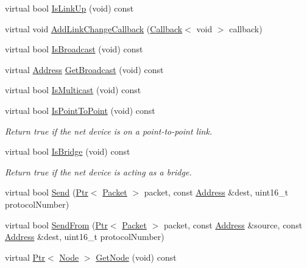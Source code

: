 \begin{DoxyCompactItemize}
\item 
virtual bool \hyperlink{classns3_1_1NonCommunicatingNetDevice_a63a1c604f491267806790c68832027b2}{Is\+Link\+Up} (void) const 
\item 
virtual void \hyperlink{classns3_1_1NonCommunicatingNetDevice_a3e37e30c8ea1ed6b7b78843d8f0155ba}{Add\+Link\+Change\+Callback} (\hyperlink{classns3_1_1Callback}{Callback}$<$ void $>$ callback)
\item 
virtual bool \hyperlink{classns3_1_1NonCommunicatingNetDevice_aa23dbd12d8ecc43f56a2367e9b39697f}{Is\+Broadcast} (void) const 
\item 
virtual \hyperlink{classns3_1_1Address}{Address} \hyperlink{classns3_1_1NonCommunicatingNetDevice_a7567737cf4a1a57835e406eaf68a1a34}{Get\+Broadcast} (void) const 
\item 
virtual bool \hyperlink{classns3_1_1NonCommunicatingNetDevice_a2b59ab714a2c4140fb0c9d6bb3eb1c25}{Is\+Multicast} (void) const 
\item 
virtual bool \hyperlink{classns3_1_1NonCommunicatingNetDevice_a9cdfd17a8bec4aae3527c55bf5b7a289}{Is\+Point\+To\+Point} (void) const 
\begin{DoxyCompactList}\small\item\em Return true if the net device is on a point-\/to-\/point link. \end{DoxyCompactList}\item 
virtual bool \hyperlink{classns3_1_1NonCommunicatingNetDevice_a8de5401381c9c051879983846fbdc699}{Is\+Bridge} (void) const 
\begin{DoxyCompactList}\small\item\em Return true if the net device is acting as a bridge. \end{DoxyCompactList}\item 
virtual bool \hyperlink{classns3_1_1NonCommunicatingNetDevice_a52ef4106e0a954d54e6586eca68525b8}{Send} (\hyperlink{classns3_1_1Ptr}{Ptr}$<$ \hyperlink{classns3_1_1Packet}{Packet} $>$ packet, const \hyperlink{classns3_1_1Address}{Address} \&dest, uint16\+\_\+t protocol\+Number)
\item 
virtual bool \hyperlink{classns3_1_1NonCommunicatingNetDevice_aee603b8d2d99bfa2831ac571a310dc06}{Send\+From} (\hyperlink{classns3_1_1Ptr}{Ptr}$<$ \hyperlink{classns3_1_1Packet}{Packet} $>$ packet, const \hyperlink{classns3_1_1Address}{Address} \&source, const \hyperlink{classns3_1_1Address}{Address} \&dest, uint16\+\_\+t protocol\+Number)
\item 
virtual \hyperlink{classns3_1_1Ptr}{Ptr}$<$ \hyperlink{classns3_1_1Node}{Node} $>$ \hyperlink{classns3_1_1NonCommunicatingNetDevice_a7564465cc39c9af06b0d1f8a6ce2f1b2}{Get\+Node} (void) const 

\end{DoxyCompactItemize}
